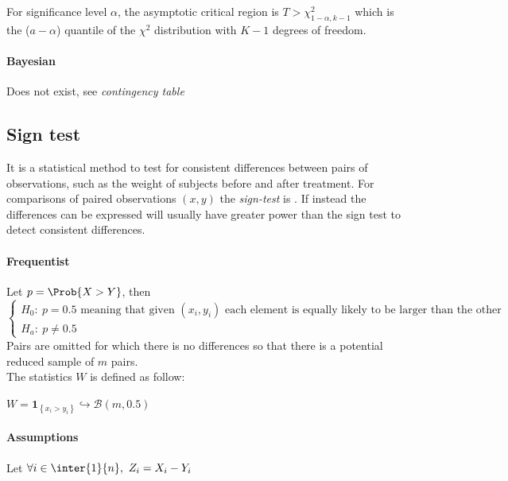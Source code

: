 For significance level $\alpha$, the asymptotic critical region is 
$T > \chi^{2}_{1-\alpha, k-1}$ which is the ($a-\alpha$) quantile of the $\chi^{2}$ 
distribution with $K-1$ degrees of freedom.

\paragraph{Bayesian}
Does not exist, see \emph{contingency table} \\



\subsection{Sign test}
It is a statistical method to test for consistent differences between pairs of 
observations, such as the weight of subjects before and after treatment.
For comparisons of paired observations $(x, y)$ the \emph{sign-test} is .
If instead the differences can be expressed  will usually have greater power than
the sign test to detect consistent differences.

\paragraph{Frequentist}
Let $p=\Prob{X>Y}$, then \\
$\begin{cases}
    H_{0}:~p=0.5\text{ meaning that given }(x_{i}, y_{i})
    \text{ each element is equally likely to be larger than the other}\\
    H_{a}:~p\neq 0.5
\end{cases}$\\
Pairs are omitted for which there is no differences so that there is a potential reduced
sample of $m$ pairs.\\
The statistics $W$ is defined as follow:
\begin{center}
    $W = \mathbf{1}_{\left\{x_{i} > y_{i}\right\}} \hookrightarrow \mathcal{B}(m, 0.5)$
\end{center}

\paragraph{Assumptions}
Let $\forall i\in\inter{1}{n},~Z_{i} = X_{i} - Y_{i}$

